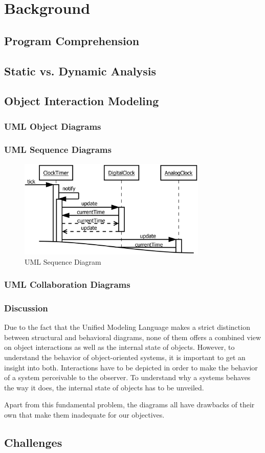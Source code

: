 \chapter{Background}
\label{c:Background}

\section{Program Comprehension}

\section{Static vs. Dynamic Analysis}

\section{Object Interaction Modeling}
\subsection{UML Object Diagrams}
\subsection{UML Sequence Diagrams}

\begin{figure}
	\centering
	\includegraphics[width=0.8\textwidth]{../images/02-Sequence}
	\caption[TOC Caption]{UML Sequence Diagram}
	\label{fig:ModelingSequence}
\end{figure}


\subsection{UML Collaboration Diagrams}

\subsection{Discussion}
Due to the fact that the Unified Modeling Language makes a strict distinction between structural and behavioral diagrams, none of them offers a combined view on object interactions as well as the internal state of objects.
However, to understand the behavior of object-oriented systems, it is important to get an insight into both.
Interactions have to be depicted in order to make the behavior of a system perceivable to the observer.
To understand why a systems behaves the way it does, the internal state of objects has to be unveiled.

Apart from this fundamental problem, the diagrams all have drawbacks of their own that make them inadequate for our objectives.

\section{Challenges}